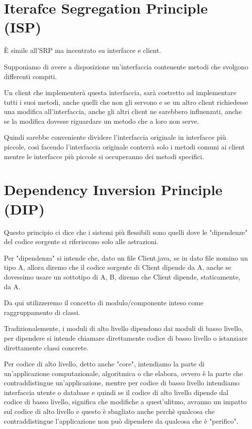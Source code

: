 \newpage
\section{Iterafce Segregation Principle (ISP)}

È simile all’SRP ma incentrato su interfacce e client.
\smallskip

Supponiamo di avere a disposizione un'interfaccia contenente metodi che svolgono differenti compiti.

Un client che implementerà questa interfaccia, sarà costretto ad implementare tutti i suoi metodi, anche quelli che non gli servono e se un altro client richiedesse una 
modifica all’interfaccia, anche gli altri client ne sarebbero influenzati, anche se la modifica dovesse riguardare un metodo che a loro non serve.

Quindi sarebbe conveniente dividere l'interfaccia originale in interfacce più piccole, così facendo l'interfaccia originale conterrà solo i metodi comuni ai client 
mentre le interfacce più piccole si occuperanno dei metodi specifici.

\section{Dependency Inversion Principle (DIP)}

Questo principio ci dice che i sistemi più flessibili sono quelli dove le "dipendenze" del codice sorgente si riferiscono solo alle astrazioni.

Per "dipendenza" si intende che, dato un file Client.java, se in dato file nomino un tipo A, allora diremo che il codice sorgente di Client dipende da A, anche se 
dovessimo usare un sottotipo di A, B, diremo che Client dipende, staticamente, da A.

Da qui utilizzeremo il concetto di modulo/componente inteso come raggruppamento di classi.
\smallskip

Tradizionalemente, i moduli di alto livello dipendono dai moduli di basso livello, per dipendere si intende chiamare direttamente codice di basso livello o istanziare
direttamente classi concrete.

Per codice di alto livello, detto anche "core", intendiamo la parte di un'applicazione computazionale, algoritmica o che elabora, ovvero è la parte che contraddistingue 
un'applicazione, mentre per codice di basso livello intendiamo interfaccia utente o database e quindi se il codice di alto livello dipende dal codice di basso livello, 
significa che modifiche a quest'ulitmo, avranno un impatto sul codice di alto livello e questo è sbagliato anche perchè qualcosa che contraddistingue l'applicazione
non può dipendere da qualcosa che è "perifico".
\smallskip

